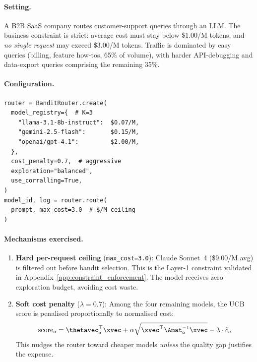 \paragraph{Setting.}
A B2B SaaS company routes customer-support queries through an LLM.  The business constraint is strict: average cost must stay below \$1.00/M tokens, and \emph{no single request} may exceed \$3.00/M tokens.  Traffic is dominated by easy queries (billing, feature how-tos, 65\% of volume), with harder API-debugging and data-export queries comprising the remaining 35\%.

\paragraph{Configuration.}

{\small\begin{verbatim}
router = BanditRouter.create(
  model_registry={  # K=3
    "llama-3.1-8b-instruct":  $0.07/M,
    "gemini-2.5-flash":       $0.15/M,
    "openai/gpt-4.1":         $2.00/M,
  },
  cost_penalty=0.7,  # aggressive
  exploration="balanced",
  use_corralling=True,
)
model_id, log = router.route(
  prompt, max_cost=3.0  # $/M ceiling
)
\end{verbatim}}

\paragraph{Mechanisms exercised.}

\begin{enumerate}[nosep,leftmargin=*]
    \item \textbf{Hard per-request ceiling} (\texttt{max\_cost=3.0}): Claude Sonnet~4 (\$9.00/M avg) is filtered out before bandit selection.  This is the Layer-1 constraint validated in Appendix~\ref{app:constraint_enforcement}.  The model receives zero exploration budget, avoiding cost waste.

    \item \textbf{Soft cost penalty} ($\lambda{=}0.7$): Among the four remaining models, the UCB score is penalised proportionally to normalised cost:
    \begin{equation}
        \text{score}_a = \thetavec_a^\top \xvec + \alpha \sqrt{\xvec^\top \Amat_a^{-1} \xvec} - \lambda \cdot \tilde{c}_a
    \end{equation}
    This nudges the router toward cheaper models \emph{unless} the quality gap justifies the expense.
\end{enumerate}

